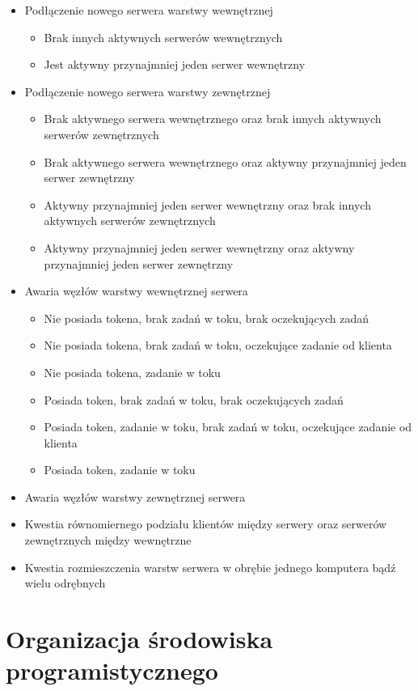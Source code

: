 \begin{itemize}
\item Podłączenie nowego serwera warstwy wewnętrznej
\begin{itemize}
\item Brak innych aktywnych serwerów wewnętrznych
\item Jest aktywny przynajmniej jeden serwer wewnętrzny
\end{itemize}
\item Podłączenie nowego serwera warstwy zewnętrznej
\begin{itemize}
\item Brak aktywnego serwera wewnętrznego oraz brak innych aktywnych serwerów zewnętrznych
\item Brak aktywnego serwera wewnętrznego oraz aktywny przynajmniej jeden serwer zewnętrzny
\item Aktywny przynajmniej jeden serwer wewnętrzny oraz brak innych aktywnych serwerów zewnętrznych
\item Aktywny przynajmniej jeden serwer wewnętrzny oraz aktywny przynajmniej jeden serwer zewnętrzny
\end{itemize}
\item Awaria węzłów warstwy wewnętrznej serwera
\begin{itemize}
\item Nie posiada tokena, brak zadań w toku, brak oczekujących zadań
\item Nie posiada tokena, brak zadań w toku, oczekujące zadanie od klienta
\item Nie posiada tokena, zadanie w toku
\item Posiada token, brak zadań w toku, brak oczekujących zadań
\item Posiada token, zadanie w toku, brak zadań w toku, oczekujące zadanie od klienta
\item Posiada token, zadanie w toku
\end{itemize}
\item Awaria węzłów warstwy zewnętrznej serwera
\item Kwestia równomiernego podziału klientów między serwery oraz serwerów zewnętrznych między wewnętrzne
\item Kwestia rozmieszczenia warstw serwera w obrębie jednego komputera bądź wielu odrębnych
\end{itemize}

\section[Organizacja środowiska programistycznego]{Organizacja środowiska programistycznego}

